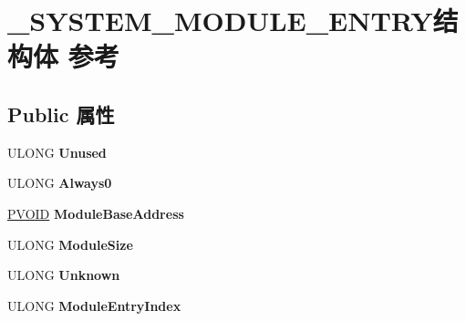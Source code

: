 \hypertarget{struct___s_y_s_t_e_m___m_o_d_u_l_e___e_n_t_r_y}{}\section{\+\_\+\+S\+Y\+S\+T\+E\+M\+\_\+\+M\+O\+D\+U\+L\+E\+\_\+\+E\+N\+T\+R\+Y结构体 参考}
\label{struct___s_y_s_t_e_m___m_o_d_u_l_e___e_n_t_r_y}
\subsection*{Public 属性}
\begin{DoxyCompactItemize}
\item 
\mbox{\label{struct___s_y_s_t_e_m___m_o_d_u_l_e___e_n_t_r_y_af5e743127d2a20ca2905f40973fd6fbf}} 
U\+L\+O\+NG {\bfseries Unused}
\item 
\mbox{\label{struct___s_y_s_t_e_m___m_o_d_u_l_e___e_n_t_r_y_a09a41e2fd8d9791f4abf8ec5fb573ca3}} 
U\+L\+O\+NG {\bfseries Always0}
\item 
\mbox{\label{struct___s_y_s_t_e_m___m_o_d_u_l_e___e_n_t_r_y_a6c7517312cbd9ca6bbf9eb5bebf2c4f0}} 
\hyperlink{interfacevoid}{P\+V\+O\+ID} {\bfseries Module\+Base\+Address}
\item 
\mbox{\label{struct___s_y_s_t_e_m___m_o_d_u_l_e___e_n_t_r_y_a56db888e07ba65e059709c0417fec87c}} 
U\+L\+O\+NG {\bfseries Module\+Size}
\item 
\mbox{\label{struct___s_y_s_t_e_m___m_o_d_u_l_e___e_n_t_r_y_a4e20c56fef148891f438f0ca03d4e2a4}} 
U\+L\+O\+NG {\bfseries Unknown}
\item 
\mbox{\label{struct___s_y_s_t_e_m___m_o_d_u_l_e___e_n_t_r_y_aa28f8a78264a5e378e8cba10fb658a0c}} 
U\+L\+O\+NG {\bfseries Module\+Entry\+Index}
\item 
\mbox{\label{struct___s_y_s_t_e_m___m_o_d_u_l_e___e_n_t_r_y_a9c2e42a3fe5b287cd285f0f9a67584a1}} 

\end{DoxyCompactItemize}
